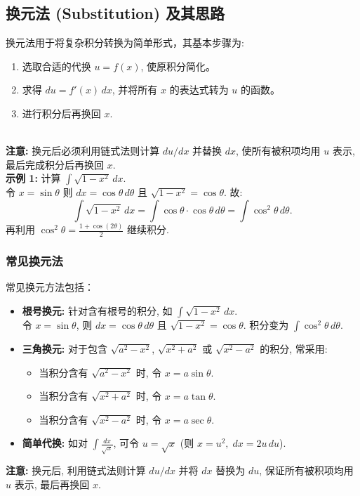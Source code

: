 \documentclass[8pt,a4paper,twoside]{tau-class/tau}
\begin{document}
\subsection{换元法 (Substitution) 及其思路}
换元法用于将复杂积分转换为简单形式，其基本步骤为:\\
\begin{enumerate}
    \item 选取合适的代换 \(u=f(x)\), 使原积分简化。
    \item 求得 \(du = f'(x)\,dx\), 并将所有 \(x\) 的表达式转为 \(u\) 的函数。
    \item 进行积分后再换回 \(x\).
\end{enumerate}
\\
\textbf{注意:} 换元后必须利用链式法则计算 \(du/dx\) 并替换 \(dx\), 使所有被积项均用 \(u\) 表示, 最后完成积分后再换回 \(x\).\\[4pt]
\textbf{示例 1:} 计算 \(\displaystyle \int \sqrt{1−x^2}\,dx\).\\[4pt]
令 \(x=\sin \theta\) 则 \(dx=\cos \theta\,d\theta\) 且 \(\sqrt{1−x^2}=\cos \theta\). 故:
\[
\int \sqrt{1−x^2}\,dx = \int \cos \theta\cdot\cos \theta\,d\theta = \int \cos^2 \theta\,d\theta.
\]
再利用 \(\cos^2 \theta=\frac{1+\cos(2\theta)}{2}\) 继续积分.

\subsubsection{常见换元法}
\begin{tcolorbox}[enhanced, breakable, boxsep=1pt, colframe=blue!50!black, colback=white, fonttitle=\footnotesize, fontupper=\footnotesize, title style={align=center}, title=常见换元法]
\noindent
常见换元方法包括：
\begin{itemize}
    \item \textbf{根号换元:} 针对含有根号的积分, 如 \(\displaystyle \int \sqrt{1−x^2}\,dx\).\\[4pt]
    令 \(x=\sin \theta\), 则 \(dx=\cos \theta\,d\theta\) 且 \(\sqrt{1−x^2}=\cos \theta\). 积分变为 \(\int \cos^2 \theta\,d\theta\).
    \item \textbf{三角换元:} 对于包含 \(\sqrt{a^2−x^2}\), \(\sqrt{x^2+a^2}\) 或 \(\sqrt{x^2−a^2}\) 的积分, 常采用:
    \begin{itemize}
       \item 当积分含有 \(\sqrt{a^2−x^2}\) 时, 令 \(x=a\sin \theta\).
       \item 当积分含有 \(\sqrt{x^2+a^2}\) 时, 令 \(x=a\tan \theta\).
       \item 当积分含有 \(\sqrt{x^2−a^2}\) 时, 令 \(x=a\sec \theta\).
    \end{itemize}
    \item \textbf{简单代换:} 如对 \(\displaystyle \int \frac{dx}{\sqrt{x}}\), 可令 \(u=\sqrt{x}\) (则 \(x=u^2, \; dx=2u\,du\)).
\end{itemize}
\textbf{注意:} 换元后, 利用链式法则计算 \(du/dx\) 并将 \(dx\) 替换为 \(du\), 保证所有被积项均用 \(u\) 表示, 最后再换回 \(x\).
\end{tcolorbox}
\newpage
\end{document}
